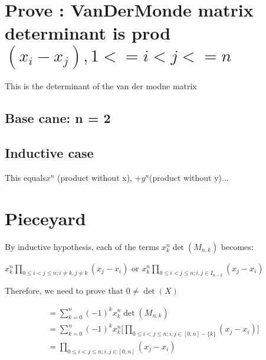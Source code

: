 \documentclass[11pt, oneside]{article} 	%
\begin{document}
\section{Prove : VanDerMonde matrix determinant is prod $(x_i - x_j), 1 <= i < j <= n$}
 This is the determinant of the van der modne matrix
\subsection{Base cane: n = 2}
\subsection{Inductive case} This equals$ x^n$ (product without x), +$ y^n $(product without y)...
\begin{comment}
- Represent as a graph tournament, n nodes, (n choose 2) edges.  There are 2^(n choose 2) possibilities.
- Each term (+/-) x_0^a_0*x_1^a_1...*x_n^a_n, where sum a_i = (n choose 2), represents one possible tournament on a directed complete graph of size n
- If there are no cycles in a given tournamnet
  - then it's of the form b^n c^n-1 ... x^1 y^0 for some b,c,...y in x_i.
- If there are ctycles in a tournament
  - Any even cycle implies an odd cycle (quick proof)
  - Therfore there's an odd cycle
  - Reversing an odd cycle produces a different graph with an odd cycle and flipped sign.
- For a tournament config that is NOT a topo sort (has a cycle)
  - There are as many positivies as negatives (PROVE?)
  - So the terms cancel out
  - Therefore everything is of the form b^n c^n-1 ... x^1 y^0
  - So big product up to n is x^n(prodcut without x) + y^n(product without y..).
*** This is zero if and only if x_i = x_j for some
*** Therefore, only one solution for n distinct points on a polynomial of size n.

\end{comment}

\section{Pieceyard}

By inductive hypothesis, each of the terms $x_k^n\det(M_{n,k})$ becomes:

$x_k^n\prod_{0 \leq i < j \leq n; i \neq k, j \neq k} (x_j - x_i)$ 
or 
$x_k^n\prod_{0 \leq i < j \leq n; i, j \in I_{n-{k}}} (x_j - x_i)$ 


Therefore, we need to prove that $0 \neq \det(X)$

\begin{align}
= \sum_{k=0}^n (-1)^k x_k^n\det(M_{n, k}) \\
= \sum_{k=0}^n (-1)^k x_k^n\Big[\prod_{0 \leq i < j \leq n; i, j \in [0,n] - \{k\}} (x_j - x_i) \Big] \\
=\prod_{0 \leq i < j \leq n; i, j \in [0,n]} (x_j - x_i) 
\end{align}
\end{document}
